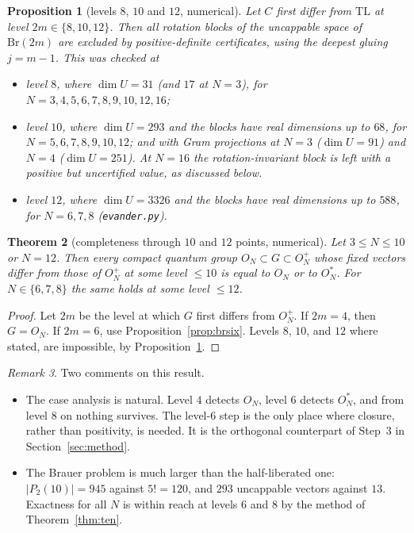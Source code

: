 \documentclass[11pt]{amsart}
\newtheorem{theorem}{Theorem}[section]
\newtheorem{proposition}[theorem]{Proposition}
\theoremstyle{definition}
\theoremstyle{remark}
\newtheorem{remark}[theorem]{Remark}
\theoremstyle{plain}
\numberwithin{equation}{section}
\numberwithin{table}{section}
\newcommand{\TL}{\mathrm{TL}}
\begin{document}
\begin{proposition}[levels $8$, $10$ and $12$, numerical]\label{prop:breightten}
Let $C$ first differ from $\TL$ at level $2m\in\{8,10,12\}$. Then all rotation blocks of the uncappable space of $\mathrm{Br}(2m)$
are excluded by positive-definite certificates, using the deepest gluing $j=m-1$. This was checked at
\begin{itemize}
\item level $8$, where $\dim U=31$ (and $17$ at $N=3$), for $N=3,4,5,6,7,8,9,10,12,16$;
\item level $10$, where $\dim U=293$ and the blocks have real dimensions up to $68$, for $N=5,6,7,8,9,10,12$; and with Gram projections at $N=3$ ($\dim U=91$) and $N=4$ ($\dim U=251$). At $N=16$ the rotation-invariant block is left with a positive but uncertified value, as discussed below.
\item level $12$, where $\dim U=3326$ and the blocks have real dimensions up to $588$, for $N=6,7,8$ (\texttt{evander.py}).
\end{itemize}
\end{proposition}

\begin{theorem}[completeness through $10$ and $12$ points, numerical]\label{thm:complete}
Let $3\le N\le10$ or $N=12$. Then every compact quantum group $O_N\subset G\subset O_N^+$ whose fixed vectors differ from those of
$O_N^+$ at some level $\le10$ is equal to $O_N$ or to $O_N^*$. For $N\in\{6,7,8\}$ the same holds at some level $\le12$.
\end{theorem}

\begin{proof}
Let $2m$ be the level at which $G$ first differs from $O_N^+$. If $2m=4$, then $G=O_N$. If $2m=6$, use Proposition~\ref{prop:brsix}. Levels $8$,
$10$, and $12$ where stated, are impossible, by Proposition~\ref{prop:breightten}.
\end{proof}

\begin{remark}
Two comments on this result.
\begin{itemize}
\item The case analysis is natural. Level $4$ detects $O_N$, level $6$ detects $O_N^*$, and from level $8$ on nothing
survives. The level-$6$ step is the only place where closure, rather than positivity, is needed. It is the orthogonal
counterpart of Step~3 in Section~\ref{sec:method}.
\item The Brauer problem is much larger than the half-liberated one: $|P_2(10)|=945$ against $5!=120$, and $293$ uncappable
vectors against $13$. Exactness for all $N$ is within reach at levels $6$ and $8$ by the method of Theorem~\ref{thm:ten}.
\end{itemize}
\end{remark}
\end{document}
